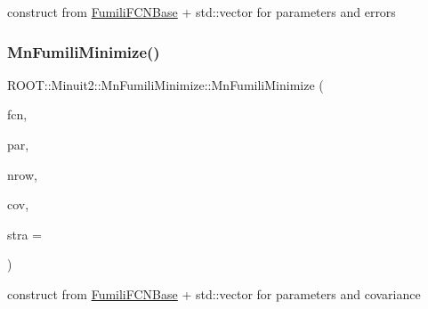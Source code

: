 construct from \mbox{\hyperlink{classROOT_1_1Minuit2_1_1FumiliFCNBase}{Fumili\+F\+C\+N\+Base}} + std\+::vector for parameters and errors 

\mbox{\label{classROOT_1_1Minuit2_1_1MnFumiliMinimize_ad12e919e837251ef358a0d461355e51c}} 
\subsubsection{\texorpdfstring{MnFumiliMinimize()}{MnFumiliMinimize()}\hspace{0.1cm}{\footnotesize\ttfamily [9/14]}}
{\footnotesize\ttfamily R\+O\+O\+T\+::\+Minuit2\+::\+Mn\+Fumili\+Minimize\+::\+Mn\+Fumili\+Minimize (\begin{DoxyParamCaption}\item[{const \mbox{\hyperlink{classROOT_1_1Minuit2_1_1FumiliFCNBase}{Fumili\+F\+C\+N\+Base}} \&}]{fcn,  }\item[{const std\+::vector$<$ double $>$ \&}]{par,  }\item[{unsigned int}]{nrow,  }\item[{const std\+::vector$<$ double $>$ \&}]{cov,  }\item[{unsigned int}]{stra = {} }\end{DoxyParamCaption})\hspace{0.3cm}{\ttfamily [inline]}}



construct from \mbox{\hyperlink{classROOT_1_1Minuit2_1_1FumiliFCNBase}{Fumili\+F\+C\+N\+Base}} + std\+::vector for parameters and covariance 

\mbox{\label{classROOT_1_1Minuit2_1_1MnFumiliMinimize_a48eae3f1c5b8eef3b6940d3fd5d26af8}} 
